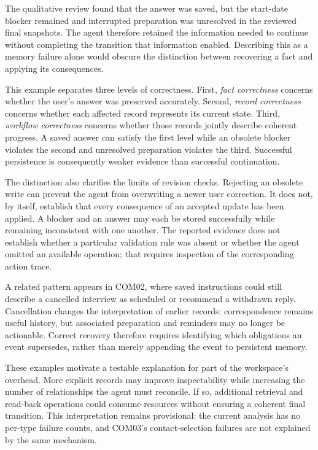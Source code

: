 \documentclass[twocolumn]{article}
\begin{document}
The qualitative review found that the answer was saved, but the start-date blocker remained and interrupted preparation was unresolved in the reviewed final snapshots. The agent therefore retained the information needed to continue without completing the transition that information enabled. Describing this as a memory failure alone would obscure the distinction between recovering a fact and applying its consequences.

This example separates three levels of correctness. First, \emph{fact correctness} concerns whether the user's answer was preserved accurately. Second, \emph{record correctness} concerns whether each affected record represents its current state. Third, \emph{workflow correctness} concerns whether those records jointly describe coherent progress. A saved answer can satisfy the first level while an obsolete blocker violates the second and unresolved preparation violates the third. Successful persistence is consequently weaker evidence than successful continuation.

The distinction also clarifies the limits of revision checks. Rejecting an obsolete write can prevent the agent from overwriting a newer user correction. It does not, by itself, establish that every consequence of an accepted update has been applied. A blocker and an answer may each be stored successfully while remaining inconsistent with one another. The reported evidence does not establish whether a particular validation rule was absent or whether the agent omitted an available operation; that requires inspection of the corresponding action trace.

A related pattern appears in COM02, where saved instructions could still describe a cancelled interview as scheduled or recommend a withdrawn reply. Cancellation changes the interpretation of earlier records: correspondence remains useful history, but associated preparation and reminders may no longer be actionable. Correct recovery therefore requires identifying which obligations an event supersedes, rather than merely appending the event to persistent memory.

These examples motivate a testable explanation for part of the workspace's overhead. More explicit records may improve inspectability while increasing the number of relationships the agent must reconcile. If so, additional retrieval and read-back operations could consume resources without ensuring a coherent final transition. This interpretation remains provisional: the current analysis has no per-type failure counts, and COM03's contact-selection failures are not explained by the same mechanism.
\end{document}
